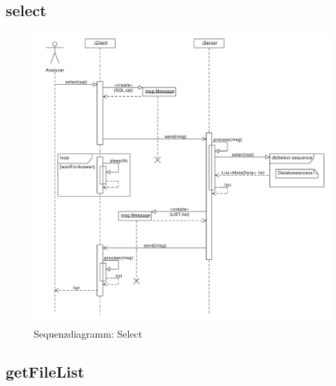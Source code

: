 \subsection {select}

\begin{figure}[h]
	\centering
	\label{design:dia:sqc:select}
	\includegraphics[width=\textwidth]{design/frontend/sequence/select-sequence.pdf}
	\caption{Sequenzdiagramm: Select}
\end{figure}

\subsection {getFileList}

